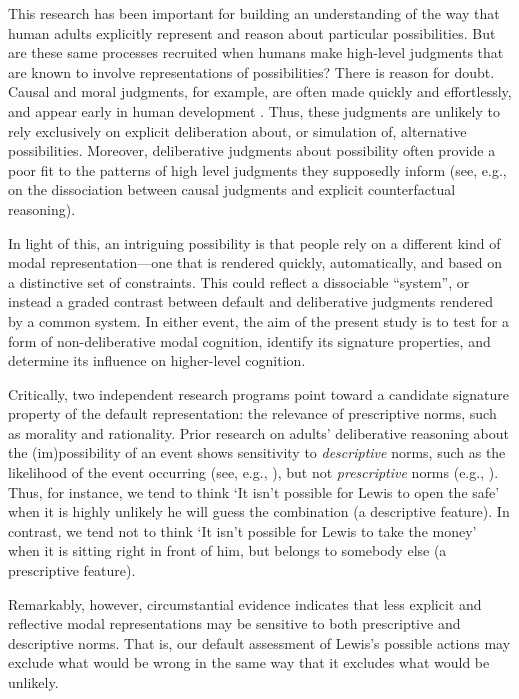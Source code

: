 \documentclass[9pt,twocolumn,twoside]{pnas-new}
\begin{document}
This research has been important for building an understanding of the way that human adults explicitly represent and reason about particular possibilities. But are these same processes recruited when humans make high-level judgments that are known to involve representations of possibilities? There is reason for doubt. Causal and moral judgments, for example, are often made quickly and effortlessly, and appear early in human development \citep{hamlin2007social,buon2013non}. Thus, these judgments are unlikely to rely exclusively on explicit deliberation about, or simulation of, alternative possibilities. Moreover, deliberative judgments about possibility often provide a poor fit to the patterns of high level judgments they supposedly inform (see, e.g., \cite{mandel1996counterfactual} on the dissociation between causal judgments and explicit counterfactual reasoning).

In light of this, an intriguing possibility is that people rely on a different kind of modal representation---one that is rendered quickly, automatically, and based on a distinctive set of constraints. This could reflect a dissociable ``system'', or instead a graded contrast between default and deliberative judgments rendered by a common system.  In either event, the aim of the present study is to test for a form of non-deliberative modal cognition, identify its signature properties, and determine its influence on higher-level cognition.

Critically, two independent research programs point toward a candidate signature property of the default representation: the relevance of prescriptive norms, such as morality and rationality. Prior research on adults' deliberative reasoning about the (im)possibility of an event shows sensitivity to \textit{descriptive} norms, such as the likelihood of the event occurring (see, e.g., \citep{shtulman2013cognitive}), but not \textit{prescriptive} norms (e.g., \citep{phillips2016do,shtulman2016differentiating}). Thus, for instance, we tend to think `It isn't possible for Lewis to open the safe' when it is highly unlikely he will guess the combination (a descriptive feature).  In contrast, we tend not to think `It isn't possible for Lewis to take the money' when it is sitting right in front of him, but belongs to somebody else (a prescriptive feature).

Remarkably, however, circumstantial evidence indicates that less explicit and reflective modal representations may be sensitive to both prescriptive and descriptive norms. That is, our default assessment of Lewis's possible actions may exclude what would be wrong in the same way that it excludes what would be unlikely.
\end{document}
